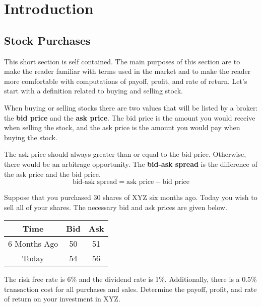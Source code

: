 \documentclass{ximera}
\begin{document}
\chapter{Introduction}

\section{Stock Purchases}

This short section is self contained. The main purposes of this section are to make the reader familiar with terms used in the market and to make the reader more comfortable with computations of payoff, profit, and rate of return. Let's start with a definition related to buying and selling stock.
\begin{definition}
When buying or selling stocks there are two values that will be listed by a broker: the {\bf bid price} and the {\bf ask price}. The bid price is the amount you would receive when selling the stock, and the ask price is the amount you would pay when buying the stock.
\end{definition}

\begin{remark}
The ask price should always greater than or equal to the bid price. Otherwise, there would be an arbitrage opportunity. The {\bf bid-ask spread} is the difference of the ask price and the bid price.
\begin{equation*}
\text{bid-ask spread}=\text{ask price}-\text{bid price}
\end{equation*}
\end{remark}

\begin{example}
Suppose that you purchased 30 shares of XYZ six months ago. Today you wish to sell all of your shares. The necessary bid and ask prices are given below.
	\begin{center}
		\begin{tabular}{c|cc}
		Time & Bid & Ask\\
		\hline
		6 Months Ago & 50 & 51\\
		Today & 54 & 56
		\end{tabular}
	\end{center}
The risk free rate is 6\% and the dividend rate is 1\%. Additionally, there is a 0.5\% transaction cost for all purchases and sales. Determine the payoff, profit, and rate of return on your investment in XYZ.
\end{example}
\end{document}
